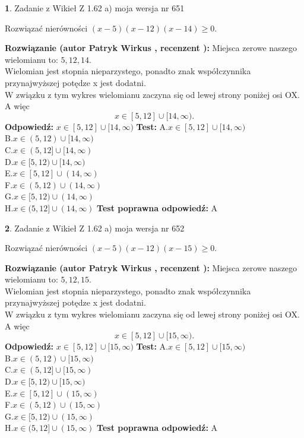 \documentclass[12pt, a4paper]{article}
\theoremstyle{definition} %
\newtheorem{zad}{}
\newcommand{\zadStart}[1]{\begin{zad}#1\newline}
\newcommand{\zadStop}{\end{zad}}
\newcommand{\rozwStart}[2]{\noindent \textbf{Rozwiązanie (autor #1 , recenzent #2): }\newline}
\newcommand{\rozwStop}{\newline}
\newcommand{\odpStart}{\noindent \textbf{Odpowiedź:}\newline}
\newcommand{\odpStop}{\newline}
\newcommand{\testStart}{\noindent \textbf{Test:}\newline}
\newcommand{\testStop}{\newline}
\newcommand{\kluczStart}{\noindent \textbf{Test poprawna odpowiedź:}\newline}
\newcommand{\kluczStop}{\newline}
\begin{document}
\zadStart{Zadanie z Wikieł Z 1.62 a) moja wersja nr 651}

Rozwiązać nierówności $(x-5)(x-12)(x-14)\ge0$.
\zadStop
\rozwStart{Patryk Wirkus}{}
Miejsca zerowe naszego wielomianu to: $5, 12, 14$.\\
Wielomian jest stopnia nieparzystego, ponadto znak współczynnika przy\linebreak najwyższej potędze x jest dodatni.\\ W związku z tym wykres wielomianu zaczyna się od lewej strony poniżej osi OX. A więc $$x \in [5,12] \cup [14,\infty).$$
\rozwStop
\odpStart
$x \in [5,12] \cup [14,\infty)$
\odpStop
\testStart
A.$x \in [5,12] \cup [14,\infty)$\\
B.$x \in (5,12) \cup [14,\infty)$\\
C.$x \in (5,12] \cup [14,\infty)$\\
D.$x \in [5,12) \cup [14,\infty)$\\
E.$x \in [5,12] \cup (14,\infty)$\\
F.$x \in (5,12) \cup (14,\infty)$\\
G.$x \in [5,12) \cup (14,\infty)$\\
H.$x \in (5,12] \cup (14,\infty)$
\testStop
\kluczStart
A
\kluczStop



\zadStart{Zadanie z Wikieł Z 1.62 a) moja wersja nr 652}

Rozwiązać nierówności $(x-5)(x-12)(x-15)\ge0$.
\zadStop
\rozwStart{Patryk Wirkus}{}
Miejsca zerowe naszego wielomianu to: $5, 12, 15$.\\
Wielomian jest stopnia nieparzystego, ponadto znak współczynnika przy\linebreak najwyższej potędze x jest dodatni.\\ W związku z tym wykres wielomianu zaczyna się od lewej strony poniżej osi OX. A więc $$x \in [5,12] \cup [15,\infty).$$
\rozwStop
\odpStart
$x \in [5,12] \cup [15,\infty)$
\odpStop
\testStart
A.$x \in [5,12] \cup [15,\infty)$\\
B.$x \in (5,12) \cup [15,\infty)$\\
C.$x \in (5,12] \cup [15,\infty)$\\
D.$x \in [5,12) \cup [15,\infty)$\\
E.$x \in [5,12] \cup (15,\infty)$\\
F.$x \in (5,12) \cup (15,\infty)$\\
G.$x \in [5,12) \cup (15,\infty)$\\
H.$x \in (5,12] \cup (15,\infty)$
\testStop
\kluczStart
A
\kluczStop
\end{document}
